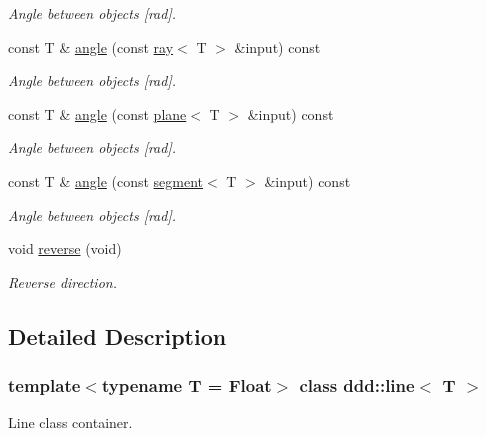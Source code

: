 \begin{DoxyCompactItemize}
\begin{DoxyCompactList}\small\item\em Angle between objects \mbox{[}rad\mbox{]}. \end{DoxyCompactList}\item 
const T \& \hyperlink{classddd_1_1line_a0d122a300125cbce9b756ed55977c5eb}{angle} (const \hyperlink{classddd_1_1ray}{ray}$<$ T $>$ \&input) const
\begin{DoxyCompactList}\small\item\em Angle between objects \mbox{[}rad\mbox{]}. \end{DoxyCompactList}\item 
const T \& \hyperlink{classddd_1_1line_a3f7bf21d9f2338f9cc5538b6269ff603}{angle} (const \hyperlink{classddd_1_1plane}{plane}$<$ T $>$ \&input) const
\begin{DoxyCompactList}\small\item\em Angle between objects \mbox{[}rad\mbox{]}. \end{DoxyCompactList}\item 
const T \& \hyperlink{classddd_1_1line_a2dff36dabec19d440e5e8069cfe830df}{angle} (const \hyperlink{classddd_1_1segment}{segment}$<$ T $>$ \&input) const
\begin{DoxyCompactList}\small\item\em Angle between objects \mbox{[}rad\mbox{]}. \end{DoxyCompactList}\item 
\mbox{\label{classddd_1_1line_a36cde9b50348cd4926a232c4803f4784}} 
void \hyperlink{classddd_1_1line_a36cde9b50348cd4926a232c4803f4784}{reverse} (void)
\begin{DoxyCompactList}\small\item\em Reverse direction. \end{DoxyCompactList}\end{DoxyCompactItemize}


\subsection{Detailed Description}
\subsubsection*{template$<$typename T = Float$>$\newline
class ddd\+::line$<$ T $>$}

Line class container. 

